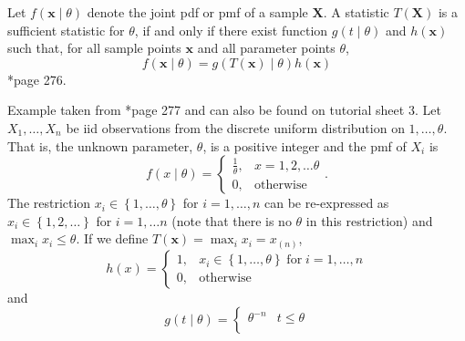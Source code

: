 \begin{thm} \label{thm: factorization_theorem}
    Let $f(\bm{x} \mid \theta)$ denote the joint pdf or pmf of a sample $\bm{X}$. A statistic $T(\bm{X})$ is a sufficient statistic for $\theta$, if and only if there exist function $g(t\mid \theta)$ and $h(\bm{x})$ such that, for all sample points $\bm{x}$ and all parameter points $\theta$,
    \begin{equation*}
        f(\bm{x} \mid \theta) = g(T(\bm{x}) \mid \theta) h(\bm{x})
    \end{equation*}
    \cite{CasellaGeorge2001SI}*{page 276}.
\end{thm}

\begin{exam} \label{exam: uni_ss_p1}
    Example taken from \cite{CasellaGeorge2001SI}*{page 277} and can also be found on tutorial sheet 3. Let $X_1 , \ldots , X_n$ be iid observations from the discrete uniform distribution on $1 , \ldots , \theta$. That is, the unknown parameter, $\theta$, is a positive integer and the pmf of $X_i$ is
    \begin{equation*}
        f(x \mid \theta) =
        \left\{
        \begin{matrix}
            \frac{1}{\theta}, & x = 1,2,\ldots \theta \\
            0,                & \text{otherwise}
        \end{matrix}
        \right. .
    \end{equation*}
    The restriction $x_i \in \left\{ 1, \ldots ,\theta \right\}$ for $i=1,\ldots ,n$ can be re-expressed as $x_i \in \left\{ 1,2 , \ldots \right\}$ for $i = 1,\ldots n$ (note that there is no $\theta$ in this restriction) and $\max_i x_i \leq \theta$. If we define $T(\bm{x}) = \max_i x_i = x_{(n)}$,
    \begin{equation*}
        h(x) =
        \left\{
        \begin{matrix}
            1, & x_i \in \left\{ 1, \ldots ,\theta \right\} \; \text{for} \; i=1,\ldots ,n \\
            0, & \text{otherwise}
        \end{matrix}
        \right.
    \end{equation*}
    and
    \begin{equation*}
        g(t \mid \theta) =
        \left\{
        \begin{matrix}
            \theta^{-n} & t \leq \theta    \\

\end{matrix}
\end{equation*}
\end{exam}
